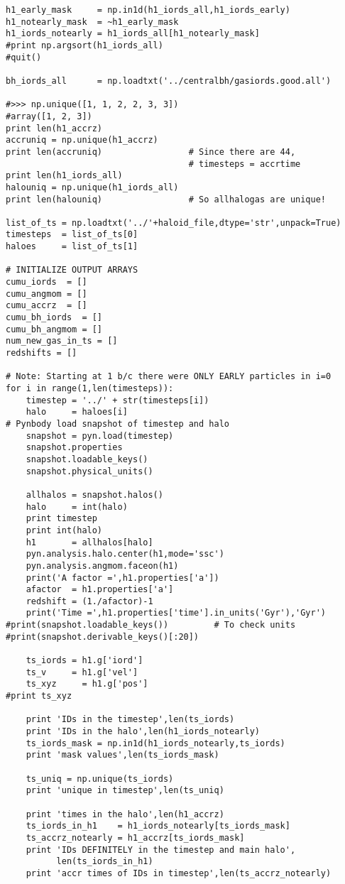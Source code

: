 \documentclass[12pt,headA,chapB]{fiskthesis}
\begin{document}
\begin{verbatim}
h1_early_mask     = np.in1d(h1_iords_all,h1_iords_early)
h1_notearly_mask  = ~h1_early_mask
h1_iords_notearly = h1_iords_all[h1_notearly_mask]
#print np.argsort(h1_iords_all)
#quit()

bh_iords_all      = np.loadtxt('../centralbh/gasiords.good.all')

#>>> np.unique([1, 1, 2, 2, 3, 3])
#array([1, 2, 3])
print len(h1_accrz)
accruniq = np.unique(h1_accrz)
print len(accruniq)                 # Since there are 44, 
                                    # timesteps = accrtime
print len(h1_iords_all)
halouniq = np.unique(h1_iords_all)
print len(halouniq)                 # So allhalogas are unique!

list_of_ts = np.loadtxt('../'+haloid_file,dtype='str',unpack=True)
timesteps  = list_of_ts[0]
haloes     = list_of_ts[1] 

# INITIALIZE OUTPUT ARRAYS
cumu_iords  = []
cumu_angmom = []
cumu_accrz  = []
cumu_bh_iords  = []
cumu_bh_angmom = [] 
num_new_gas_in_ts = []
redshifts = []

# Note: Starting at 1 b/c there were ONLY EARLY particles in i=0 
for i in range(1,len(timesteps)):
    timestep = '../' + str(timesteps[i])
    halo     = haloes[i]    
# Pynbody load snapshot of timestep and halo
    snapshot = pyn.load(timestep)
    snapshot.properties
    snapshot.loadable_keys()
    snapshot.physical_units()
    
    allhalos = snapshot.halos()            
    halo     = int(halo)
    print timestep
    print int(halo)
    h1       = allhalos[halo]
    pyn.analysis.halo.center(h1,mode='ssc')
    pyn.analysis.angmom.faceon(h1)
    print('A factor =',h1.properties['a'])
    afactor  = h1.properties['a']
    redshift = (1./afactor)-1
    print('Time =',h1.properties['time'].in_units('Gyr'),'Gyr')
#print(snapshot.loadable_keys())         # To check units
#print(snapshot.derivable_keys()[:20])

    ts_iords = h1.g['iord']
    ts_v     = h1.g['vel']
    ts_xyz     = h1.g['pos']
#print ts_xyz

    print 'IDs in the timestep',len(ts_iords)
    print 'IDs in the halo',len(h1_iords_notearly)
    ts_iords_mask = np.in1d(h1_iords_notearly,ts_iords)
    print 'mask values',len(ts_iords_mask)

    ts_uniq = np.unique(ts_iords)
    print 'unique in timestep',len(ts_uniq) 
    
    print 'times in the halo',len(h1_accrz)
    ts_iords_in_h1    = h1_iords_notearly[ts_iords_mask]    
    ts_accrz_notearly = h1_accrz[ts_iords_mask]
    print 'IDs DEFINITELY in the timestep and main halo',
          len(ts_iords_in_h1)
    print 'accr times of IDs in timestep',len(ts_accrz_notearly)


\end{verbatim}
\end{document}
